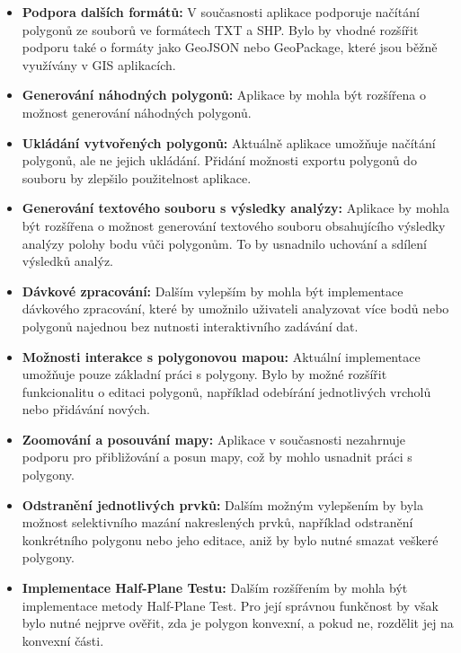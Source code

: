 \begin{itemize} 
    \item \textbf{Podpora dalších formátů:} V současnosti aplikace podporuje načítání polygonů ze souborů ve formátech TXT a SHP. Bylo by vhodné rozšířit podporu také o formáty jako GeoJSON nebo GeoPackage, které jsou běžně využívány v GIS aplikacích.

     \item \textbf{Generování náhodných polygonů:} Aplikace by mohla být rozšířena o možnost generování náhodných polygonů.

    \item \textbf{Ukládání vytvořených polygonů:} Aktuálně aplikace umožňuje načítání polygonů, ale ne jejich ukládání. Přidání možnosti exportu polygonů do souboru by zlepšilo použitelnost aplikace.

    \item \textbf{Generování textového souboru s výsledky analýzy:} Aplikace by mohla být rozšířena o možnost generování textového souboru obsahujícího výsledky analýzy polohy bodu vůči polygonům. To by usnadnilo uchování a sdílení výsledků analýz.
    
    \item \textbf{Dávkové zpracování:} Dalším vylepším by mohla být implementace dávkového zpracování, které by umožnilo uživateli analyzovat více bodů nebo polygonů najednou bez nutnosti interaktivního zadávání dat.
    
    \item \textbf{Možnosti interakce s polygonovou mapou:} Aktuální implementace umožňuje pouze základní práci s polygony. Bylo by možné rozšířit funkcionalitu o editaci polygonů, například odebírání jednotlivých vrcholů nebo přidávání nových.
    
    \item \textbf{Zoomování a posouvání mapy:} Aplikace v současnosti nezahrnuje podporu pro přibližování a posun mapy, což by mohlo usnadnit práci s polygony.
    
    \item \textbf{Odstranění jednotlivých prvků:} Dalším možným vylepšením by byla možnost selektivního mazání nakreslených prvků, například odstranění konkrétního polygonu nebo jeho editace, aniž by bylo nutné smazat veškeré polygony.

    \item \textbf{Implementace Half-Plane Testu:} Dalším rozšířením by mohla být implementace metody Half-Plane Test. Pro její správnou funkčnost by však bylo nutné nejprve ověřit, zda je polygon konvexní, a pokud ne, rozdělit jej na konvexní části.


\end{itemize}
